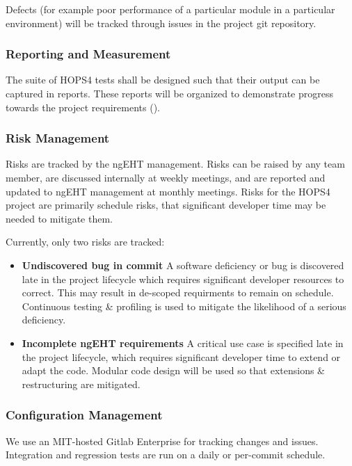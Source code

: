 Defects (for example poor performance of a particular module in a particular environment) will be tracked through issues in the project git repository. 


\subsubsection{Reporting and Measurement}

The suite of HOPS4 tests shall be designed such that their output can be captured in reports. These reports will be organized to demonstrate progress towards the project requirements (). 

\subsubsection{Risk Management}

Risks are tracked by the \ac{ngEHT} management. Risks can be raised by any team member, are discussed internally at weekly meetings, and are reported and updated to \ac{ngEHT} management at monthly meetings. Risks for the HOPS4 project are primarily schedule risks, \eg that significant developer time may be needed to mitigate them.

Currently, only two risks are tracked:

\begin{itemize}

\item \textbf{Undiscovered bug in commit} A software deficiency or bug is discovered late in the project lifecycle which requires significant developer resources to correct. This may result in de-scoped requirments to remain on schedule. Continuous testing \& profiling is used to mitigate the likelihood of a serious deficiency.

\item \textbf{Incomplete ngEHT requirements} A critical use case is specified late in the project lifecycle, which requires significant developer time to extend or adapt the code. Modular code design will be used so that extensions \& restructuring are mitigated. 

\end{itemize}


\subsubsection{Configuration Management}

We use an MIT-hosted Gitlab Enterprise for tracking changes and issues.  Integration and regression tests are run on a daily or per-commit schedule.


%
%
